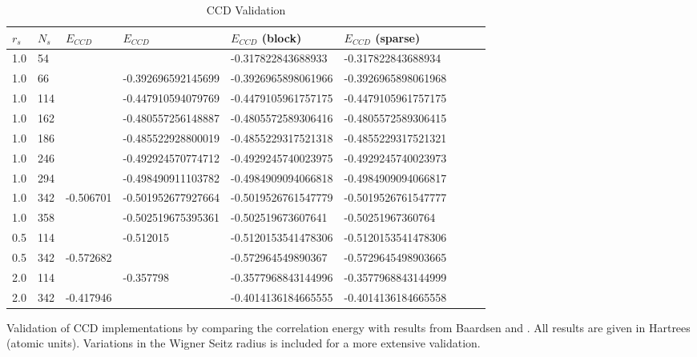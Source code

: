 \begin{table}[h]
\caption{CCD Validation}
\begin{center}
\begin{threeparttable}
\begin{tabular}{l l l l l l l l l}
    \toprule
$r_s$ & $N_s$ & $E_{CCD}$ \cite{Roggero2013} & $E_{CCD}$ \cite{Baardsen2014, Baardsen2015} & $E_{CCD}$ (block) & $E_{CCD}$ (sparse)& \\ \hline
1.0 &54 & & &-0.317822843688933 & -0.317822843688934\\
1.0 &66 & & -0.392696592145699  &-0.3926965898061966 &-0.3926965898061968 \\
 1.0 &114 & & -0.447910594079769 &-0.4479105961757175 & -0.4479105961757175\\
1.0 &162  & & -0.480557256148887 &-0.4805572589306416 &-0.4805572589306415 \\
1.0 &186 & &-0.485522928800019 &-0.4855229317521318 &-0.4855229317521321 \\
1.0 & 246 &  &-0.492924570774712&-0.4929245740023975 & -0.4929245740023973\\
1.0 & 294 & &-0.498490911103782 & -0.4984909094066818 &-0.4984909094066817 \\
1.0 & 342 & -0.506701& -0.501952677927664 &  -0.5019526761547779 &-0.5019526761547777 \\
1.0 & 358 & &-0.502519675395361 & -0.502519673607641 &-0.50251967360764 \\ \hline
0.5 & 114 & &-0.512015  & -0.5120153541478306 & -0.5120153541478306 \\ 
0.5 & 342 & -0.572682 & & -0.572964549890367 &-0.5729645498903665 &  \\ \hline
2.0 & 114 &  & -0.357798  & -0.3577968843144996 &-0.3577968843144999 \\
2.0 & 342 & -0.417946 & & -0.4014136184665555&-0.4014136184665558 & \\
\bottomrule
\end{tabular}
\begin{tablenotes}
Validation of CCD implementations by comparing the correlation energy with results from Baardsen \cite[table 5.2]{Baardsen2014} and \cite{Baardsen2015}. All results are given in Hartrees (atomic units). Variations in the Wigner Seitz radius is included for a more extensive validation.
\end{tablenotes}
\end{threeparttable}
\end{center}
\label{tab:ccd_valid}
\end{table}

